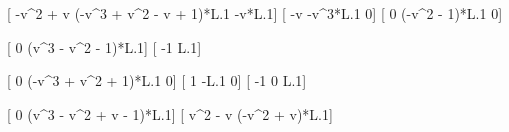 \documentclass{amsart}
\begin{document}
[                -v^2 + v (-v^3 + v^2 - v + 1)*L.1                   -v*L.1]
[                      -v                 -v^3*L.1                        0]
[                       0           (-v^2 - 1)*L.1                        0]

[                  0 (v^3 - v^2 - 1)*L.1]
[                 -1                 L.1]

[                   0 (-v^3 + v^2 + 1)*L.1                    0]
[                   1                 -L.1                    0]
[                  -1                    0                  L.1]

[                      0 (v^3 - v^2 + v - 1)*L.1]
[                v^2 - v          (-v^2 + v)*L.1]
\fi
\end{document}

